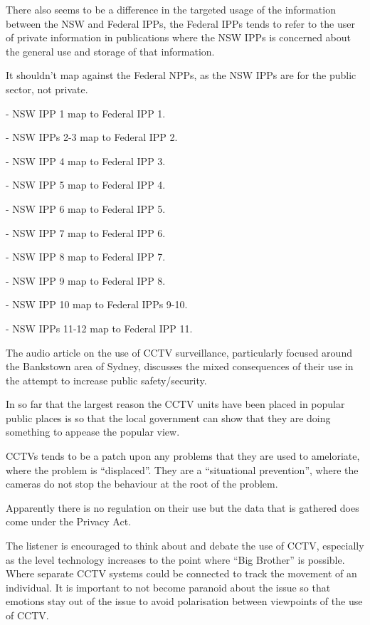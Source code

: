 
There also seems to be a difference in the targeted usage of the information between the NSW and Federal IPPs, the Federal IPPs tends to refer to the user of private information in publications where the NSW IPPs is concerned about the general use and storage of that information.


It shouldn't map against the Federal NPPs, as the NSW IPPs are for the public sector, not private.

\item - NSW IPP 1 map to Federal IPP 1.
\item - NSW IPPs 2-3 map to Federal IPP 2.
\item - NSW IPP 4 map to Federal IPP 3.
\item - NSW IPP 5 map to Federal IPP 4.
\item - NSW IPP 6 map to Federal IPP 5.
\item - NSW IPP 7 map to Federal IPP 6.
\item - NSW IPP 8 map to Federal IPP 7.
\item - NSW IPP 9 map to Federal IPP 8.
\item - NSW IPP 10 map to Federal IPPs 9-10.
\item - NSW IPPs 11-12 map to Federal IPP 11.


The audio article on the use of CCTV surveillance, particularly focused around the Bankstown area of Sydney, discusses the mixed consequences of their use in the attempt to increase public safety/security.

In so far that the largest reason the CCTV units have been placed in popular public places is so that the local government can show that they are doing something to appease the popular view.

CCTVs tends to be a patch upon any problems that they are used to ameloriate, where the problem is ``displaced''. They are a ``situational prevention'', where the cameras do not stop the behaviour at the root of the problem.

Apparently there is no regulation on their use but the data that is gathered does come under the Privacy Act.

The listener is encouraged to think about and debate the use of CCTV, especially as the level technology increases to the point where ``Big Brother'' is possible. Where separate CCTV systems could be connected to track the movement of an individual. It is important to not become paranoid about the issue so that emotions stay out of the issue to avoid polarisation between viewpoints of the use of CCTV.

